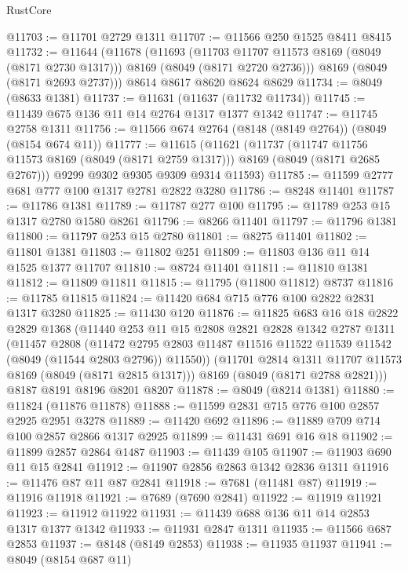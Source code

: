 \begin{lexlean}{RustCore}
\begin{coremodule}
@11703 := @11701 @2729 @1311
@11707 := @11566 @250 @1525 @8411 @8415
@11732 := @11644
    (@11678
      (@11693
        (@11703 @11707 @11573 @8169 (@8049 (@8171 @2730 @1317)))
        @8169
        (@8049 (@8171 @2720 @2736)))
      @8169
      (@8049 (@8171 @2693 @2737)))
    @8614
    @8617
    @8620
    @8624
    @8629
@11734 := @8049 (@8633 @1381)
@11737 := @11631 (@11637 (@11732 @11734))
@11745 := @11439 @675 @136 @11 @14 @2764 @1317 @1377 @1342
@11747 := @11745 @2758 @1311
@11756 := @11566 @674 @2764 (@8148 (@8149 @2764)) (@8049 (@8154 @674 @11))
@11777 := @11615
    (@11621
      (@11737
        (@11747 @11756 @11573 @8169 (@8049 (@8171 @2759 @1317)))
        @8169
        (@8049 (@8171 @2685 @2767)))
      @9299
      @9302
      @9305
      @9309
      @9314
      @11593)
@11785 := @11599 @2777 @681 @777 @100 @1317 @2781 @2822 @3280
@11786 := @8248 @11401
@11787 := @11786 @1381
@11789 := @11787 @277 @100
@11795 := @11789 @253 @15 @1317 @2780 @1580 @8261
@11796 := @8266 @11401
@11797 := @11796 @1381
@11800 := @11797 @253 @15 @2780
@11801 := @8275 @11401
@11802 := @11801 @1381
@11803 := @11802 @251
@11809 := @11803 @136 @11 @14 @1525 @1377 @11707
@11810 := @8724 @11401
@11811 := @11810 @1381
@11812 := @11809 @11811
@11815 := @11795 (@11800 @11812) @8737
@11816 := @11785 @11815
@11824 := @11420 @684 @715 @776 @100 @2822 @2831 @1317 @3280
@11825 := @11430 @120
@11876 := @11825
    @683
    @16
    @18
    @2822
    @2829
    @1368
    (@11440
      @253
      @11
      @15
      @2808
      @2821
      @2828
      @1342
      @2787
      @1311
      (@11457
        @2808
        (@11472 @2795 @2803 @11487 @11516 @11522 @11539 @11542 (@8049 (@11544 @2803 @2796)) @11550))
      (@11701 @2814 @1311 @11707 @11573 @8169 (@8049 (@8171 @2815 @1317)))
      @8169
      (@8049 (@8171 @2788 @2821)))
    @8187
    @8191
    @8196
    @8201
    @8207
@11878 := @8049 (@8214 @1381)
@11880 := @11824 (@11876 @11878)
@11888 := @11599 @2831 @715 @776 @100 @2857 @2925 @2951 @3278
@11889 := @11420 @692
@11896 := @11889 @709 @714 @100 @2857 @2866 @1317 @2925
@11899 := @11431 @691 @16 @18
@11902 := @11899 @2857 @2864 @1487
@11903 := @11439 @105
@11907 := @11903 @690 @11 @15 @2841
@11912 := @11907 @2856 @2863 @1342 @2836 @1311
@11916 := @11476 @87 @11 @87 @2841
@11918 := @7681 (@11481 @87)
@11919 := @11916 @11918
@11921 := @7689 (@7690 @2841)
@11922 := @11919 @11921
@11923 := @11912 @11922
@11931 := @11439 @688 @136 @11 @14 @2853 @1317 @1377 @1342
@11933 := @11931 @2847 @1311
@11935 := @11566 @687 @2853
@11937 := @8148 (@8149 @2853)
@11938 := @11935 @11937
@11941 := @8049 (@8154 @687 @11)

\end{coremodule}
\end{lexlean}
